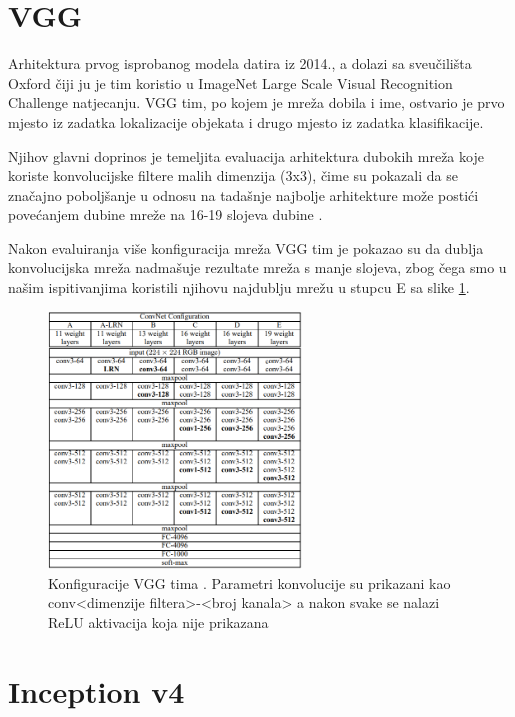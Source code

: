 \documentclass[times, utf8, proizvoljni, numeric]{fer}
\begin{document}
\section{VGG}

Arhitektura prvog isprobanog modela datira iz 2014., a dolazi sa sveučilišta Oxford čiji ju je tim koristio u ImageNet Large Scale Visual Recognition Challenge natjecanju. VGG tim, po kojem je mreža dobila i ime, ostvario je prvo mjesto iz zadatka lokalizacije objekata i drugo mjesto iz zadatka klasifikacije.

Njihov glavni doprinos je temeljita evaluacija arhitektura dubokih mreža koje koriste konvolucijske filtere malih dimenzija (3x3), čime su pokazali da se značajno poboljšanje u odnosu na tadašnje najbolje arhitekture može postići povećanjem dubine mreže na 16-19 slojeva dubine \cite{VGG}. 

Nakon evaluiranja više konfiguracija mreža VGG tim je pokazao su da dublja konvolucijska mreža nadmašuje rezultate mreža s manje slojeva, zbog čega smo u našim ispitivanjima koristili njihovu najdublju mrežu u stupcu E sa slike \ref{fg:vgg}.

\begin{figure}[!ht]
	\begin{center}
		\captionsetup{justification=centering}
		\includegraphics[width=0.6\textwidth]{./imgs/vgg.png}
		\caption{Konfiguracije VGG tima \cite{VGG}. Parametri konvolucije su prikazani kao conv<dimenzije filtera>-<broj kanala> a nakon svake se nalazi ReLU aktivacija koja nije prikazana}
		\label{fg:vgg}
	\end{center}
\end{figure}

\section{Inception v4}
\end{document}
